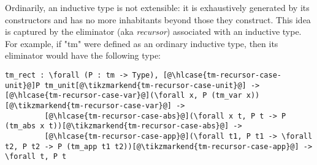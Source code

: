 
Ordinarily, an inductive type is not extensible: it is exhaustively
generated by its constructors and has no more inhabitants beyond those
they construct.
This idea is captured by the eliminator (aka \emph{recursor})
associated with an inductive type.
For example, if "tm" were defined as an ordinary inductive type, then
its eliminator would have the following type:


\begin{centered}
\begin{minipage}{.71\textwidth}
\newcommand\hlcase[1]{\tikzmarkin[disable rounded corners=true,set fill color=yellow!18,set border color=yellow!18]{#1}(0.00,-0.05)(-0.00,0.20)}
\begin{lstlisting}[basicstyle=\fontsize{8.25}{9.9}\ttfamily]
tm_rect : \forall (P : tm -> Type), [@\hlcase{tm-recursor-case-unit}@]P tm_unit[@\tikzmarkend{tm-recursor-case-unit}@] -> [@\hlcase{tm-recursor-case-var}@](\forall x, P (tm_var x))[@\tikzmarkend{tm-recursor-case-var}@] ->
         [@\hlcase{tm-recursor-case-abs}@](\forall x t, P t -> P (tm_abs x t))[@\tikzmarkend{tm-recursor-case-abs}@] ->
         [@\hlcase{tm-recursor-case-app}@](\forall t1, P t1 -> \forall t2, P t2 -> P (tm_app t1 t2))[@\tikzmarkend{tm-recursor-case-app}@] -> \forall t, P t
\end{lstlisting}
\end{minipage}
\end{centered}


